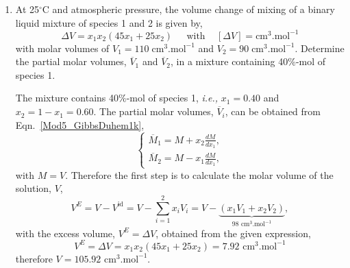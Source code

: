 \documentclass[12pts,a4paper,amsmath,amssymb,floatfix]{article}%
\newcommand{\frc}{\displaystyle\frac}
\newcommand{\ie}{{\it i.e., }}
\newcommand{\summation}[3][error]{\sum\limits_{#2}^{#3}#1}
\begin{document}
\begin{enumerate}[1)]
   \item\label{Mod05Ex01} At 25$^{\circ}$C and atmospheric pressure, the volume change of mixing of a binary liquid mixture of species 1 and 2 is given by,
       \begin{displaymath}
          \Delta V = x_{1}x_{2}\left(45x_{1}+25x_{2}\right)\;\;\;\;\text{ with }\;\;\;\left[\Delta V\right] = \text{cm}^{3}.\text{mol}^{-1}
       \end{displaymath}
       with molar volumes of $V_{1} = 110\;\text{cm}^{3}.\text{mol}^{-1}$ and $V_{2} = 90\;\text{cm}^{3}.\text{mol}^{-1}$. Determine the partial molar volumes, $\overline{V}_{1}$ and $\overline{V}_{2}$, in a mixture containing 40$\%$-mol of species 1.

        The mixture contains 40$\%$-mol of species 1, \ie $x_{1}=0.40$ and $x_{2}=1-x_{1}=0.60$. The partial molar volumes, $\overline{V}_{i}$, can be obtained from Eqn.~\ref{Mod5_GibbsDuhem1k}, 
               \begin{displaymath}
                 \begin{cases}
                    \overline{M}_{1} = M + x_{2}\frc{dM}{dx_{1}},\\
                    \overline{M}_{2} = M - x_{1}\frc{dM}{dx_{1}},
                 \end{cases}
              \end{displaymath}
              with $M=V$. Therefore the first step is to calculate the molar volume of the solution, $V$,
                 \begin{displaymath}
                    V^{E} = V - V^{\text{id}} = V - \summation[x_{i}V_{i}]{i=1}{2} = V - \underbrace{\left(x_{1}V_{1} + x_{2}V_{2}\right)}_{98\text{ cm}^{3}.\text{mol}^{-1}},
                 \end{displaymath}
              with the excess volume, $V^{E}=\Delta V$, obtained from the given expression,
                 \begin{displaymath}
                    V^{E} = \Delta V = x_{1}x_{2}\left(45x_{1}+25x_{2}\right) = 7.92\text{ cm}^{3}.\text{mol}^{-1}
                 \end{displaymath}
              therefore $V=105.92\text{ cm}^{3}.\text{mol}^{-1}$.
\medskip


\end{enumerate}
\end{document}
